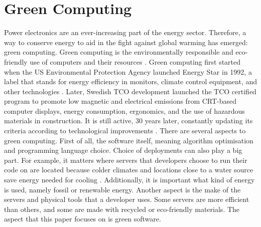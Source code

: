 \chapter{Green Computing}

Power electronics are an ever-increasing part of the energy sector. Therefore, a way to conserve energy to aid in the fight against global warming has emerged: green computing.
Green computing is the environmentally responsible and eco-friendly use of computers and their resources \cite{Salama20}. Green computing first started when the US Environmental Protection Agency launched Energy Star in 1992, a label that stands for energy efficiency in monitors, climate control equipment, and other technologies \cite{ENERGYSTAR}.
Later, Swedish TCO development launched the TCO certified program to promote low magnetic and electrical emissions from CRT-based computer displays, energy consumption, ergonomics, and the use of hazardous materials in construction. It is still active, 30 years later, constantly updating its criteria according to technological improvements \cite{TCOCertified}.
There are several aspects to green computing. First of all, the software itself, meaning algorithm optimisation and programming language choice. Choice of deployments can also play a big part. For example, it matters where servers that developers choose to run their code on are located because colder climates and locations close to a water source save energy needed for cooling \cite{cooling_datacenters}. Additionally, it is important what kind of energy is used, namely fossil or renewable energy. Another aspect is the make of the servers and physical tools that a developer uses. Some servers are more efficient than others, and some are made with recycled or eco-friendly materials.
The aspect that this paper focuses on is green software.

